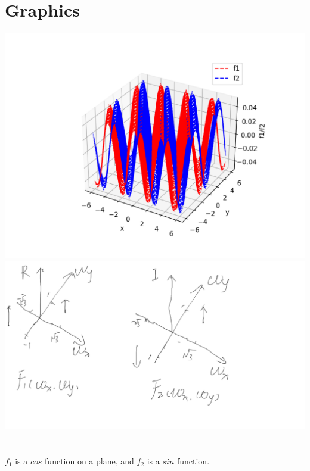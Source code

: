 \documentclass{article}
\begin{document}
\section{Graphics}
\includegraphics[width=\textwidth]{h1_1.png}
\includegraphics[width=\textwidth]{h1_2.png}

\section{}
$f_1$ is a $cos$ function on a plane, and $f_2$ is a $sin$ function.
\end{document}
